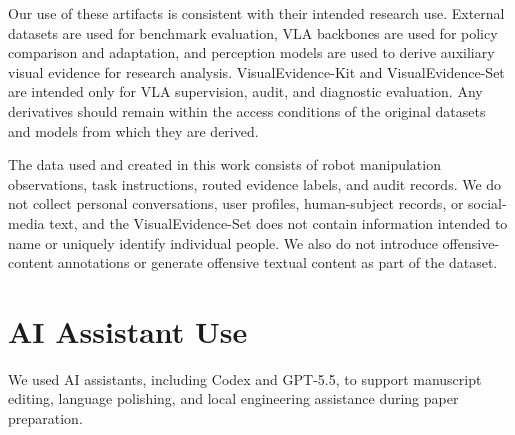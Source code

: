 Our use of these artifacts is consistent with their intended research use. External datasets are used for benchmark evaluation, VLA backbones are used for policy comparison and adaptation, and perception models are used to derive auxiliary visual evidence for research analysis. VisualEvidence-Kit and VisualEvidence-Set are intended only for VLA supervision, audit, and diagnostic evaluation. Any derivatives should remain within the access conditions of the original datasets and models from which they are derived.

The data used and created in this work consists of robot manipulation observations, task instructions, routed evidence labels, and audit records. We do not collect personal conversations, user profiles, human-subject records, or social-media text, and the VisualEvidence-Set does not contain information intended to name or uniquely identify individual people. We also do not introduce offensive-content annotations or generate offensive textual content as part of the dataset.

\section{AI Assistant Use}

We used AI assistants, including Codex and GPT-5.5, to support manuscript editing, language polishing, and local engineering assistance during paper preparation. 

